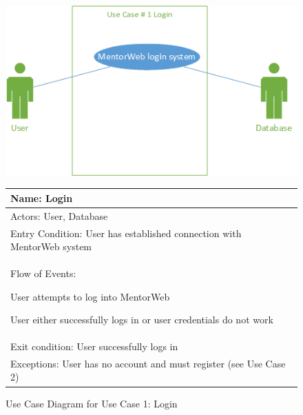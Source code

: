 \documentclass[11pt]{article}
\begin{document}
            \begin{figure}[H]
				\centering
				\includegraphics{UseCase1Login}

				\begin{tabular}{|p{12 cm}|}
					\hline
					Name: Login \\ \hline
					Actors: User, Database \\ \hline
					Entry Condition: User has established connection with
					MentorWeb system\\ \hline
					Flow of Events:
					\begin{enumerate*}
						\item User attempts to log into MentorWeb
						\item User either successfully logs in or user
						credentials do not work
					\end{enumerate*} \\ \hline
					Exit condition: User successfully logs in \\ \hline
					Exceptions: User has no account and must register (see Use
					Case 2) \\ \hline
				\end{tabular}

				\caption{Use Case Diagram for Use Case 1: Login}
				\label{UC1}
            \end{figure}
\end{document}
